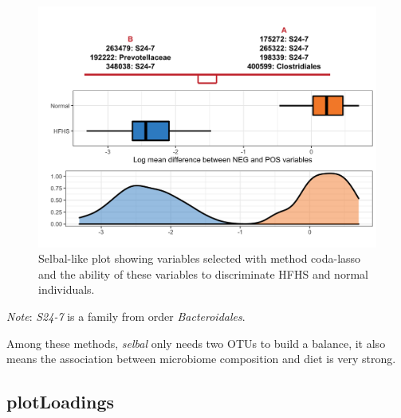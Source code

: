 \documentclass[openany]{book}
\newenvironment{Shaded}{\begin{snugshade}}{\end{snugshade}}
\newcommand{\KeywordTok}[1]{\textcolor[rgb]{0.13,0.29,0.53}{\textbf{#1}}}
\newcommand{\DataTypeTok}[1]{\textcolor[rgb]{0.13,0.29,0.53}{#1}}
\newcommand{\StringTok}[1]{\textcolor[rgb]{0.31,0.60,0.02}{#1}}
\newcommand{\CommentTok}[1]{\textcolor[rgb]{0.56,0.35,0.01}{\textit{#1}}}
\newcommand{\OperatorTok}[1]{\textcolor[rgb]{0.81,0.36,0.00}{\textbf{#1}}}
\newcommand{\NormalTok}[1]{#1}
\begin{document}
\begin{figure}

{\centering \includegraphics[width=1\linewidth]{./Generated_plots/unnamed-chunk-54-1} 

}

\caption{Selbal-like plot showing variables selected with method coda-lasso and the ability of these variables to discriminate HFHS and normal individuals.}\label{fig:unnamed-chunk-54}
\end{figure}

\emph{Note}: \emph{S24-7} is a family from order \emph{Bacteroidales}.

Among these methods, \emph{selbal} only needs two OTUs to build a
balance, it also means the association between microbiome composition
and diet is very strong.

\subsection{plotLoadings}\label{plotloadings-1}

\begin{Shaded}
\end{Shaded}
\end{document}
